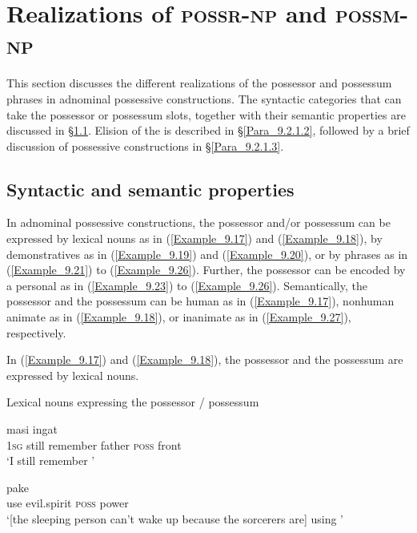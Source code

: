 \section{Realizations of \textsc{possr-np} and \textsc{possm-np}}
\label{Para_9.2}
This section discusses the different realizations of the possessor and possessum  phrases in adnominal possessive constructions. The syntactic categories that can take the possessor or possessum slots, together with their semantic properties are discussed in §\ref{Para_9.2.1.1}. Elision of the  is described in §\ref{Para_9.2.1.2}, followed by a brief discussion of  possessive constructions in §\ref{Para_9.2.1.3}.


\subsection[Syntactic and semantic properties]{Syntactic and semantic properties}
\label{Para_9.2.1.1}
In adnominal possessive constructions, the possessor and/or possessum can be expressed by lexical nouns as in (\ref{Example_9.17}) and (\ref{Example_9.18}), by demonstratives as in (\ref{Example_9.19}) and (\ref{Example_9.20}), or by  phrases as in (\ref{Example_9.21}) to (\ref{Example_9.26}). Further, the possessor can be encoded by a personal  as in (\ref{Example_9.23}) to (\ref{Example_9.26}). Semantically, the possessor and the possessum can be human as in (\ref{Example_9.17}), nonhuman animate as in (\ref{Example_9.18}), or inanimate as in (\ref{Example_9.27}), respectively.



In (\ref{Example_9.17}) and (\ref{Example_9.18}), the possessor and the possessum are expressed by lexical nouns.



\begin{styleExampleTitle}
Lexical nouns expressing the possessor / possessum
\end{styleExampleTitle}

\ea
\label{Example_9.17}
 {masi} {ingat} {} {} {}\\ %
 \textsc{1sg}  still  remember  father  \textsc{poss}  front\\
\glt 
‘I still remember ’ \textstyleExampleSource{[080922-001a-CvPh.1307]}
\z

\ea
\label{Example_9.18}
\gll {\ldots} {pake} {} {} {}\\ %
 { }  use  evil.spirit  \textsc{poss}  power\\
 ‘[the sleeping person can’t wake up because the sorcerers are] using ’ \textstyleExampleSource{[081006-022-CvEx.0084]}
\z




